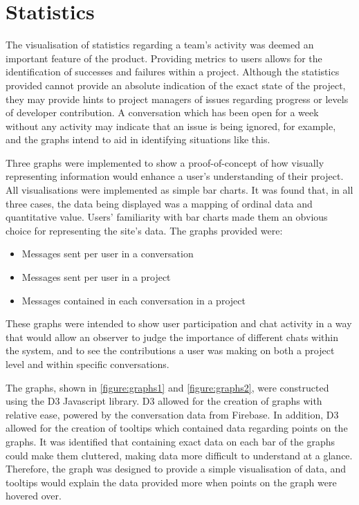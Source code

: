 \documentclass[a4paper]{l3proj}
\begin{document}
\section{Statistics}
\label{statistics}

The visualisation of statistics regarding a team’s activity was deemed an important feature of the product. Providing metrics to users allows for the identification of successes and failures within a project. Although the statistics provided cannot provide an absolute indication of the exact state of the project, they may provide hints to project managers of issues regarding progress or levels of developer contribution. A conversation which has been open for a week without any activity may indicate that an issue is being ignored, for example, and the graphs intend to aid in identifying situations like this.

Three graphs were implemented to show a proof-of-concept of how visually representing information would enhance a user’s understanding of their project. 
All visualisations were implemented as simple bar charts. It was found that, in all three cases, the data being displayed was a mapping of ordinal data and quantitative value. Users’ familiarity with bar charts made them an obvious choice for representing the site’s data. 
The graphs provided were:

\begin{itemize}
\item Messages sent per user in a conversation
\item Messages sent per user in a project
\item Messages contained in each conversation in a project
\end{itemize}

These graphs were intended to show user participation and chat activity in a way that would allow an observer to judge the importance of different chats within the system, and to see the contributions a user was making on both a project level and within specific conversations.

The graphs, shown in \autoref{figure:graphs1} and \autoref{figure:graphs2}, were constructed using the D3 \cite{site:d3} Javascript library. D3 allowed for the creation of graphs with relative ease, powered by the conversation data from Firebase.
In addition, D3 allowed for the creation of tooltips which contained data regarding points on the graphs. It was identified that containing exact data on each bar of the graphs could make them cluttered, making data more difficult to understand at a glance. Therefore, the graph was designed to provide a simple visualisation of data, and tooltips would explain the data provided more when points on the graph were hovered over. 
\end{document}
